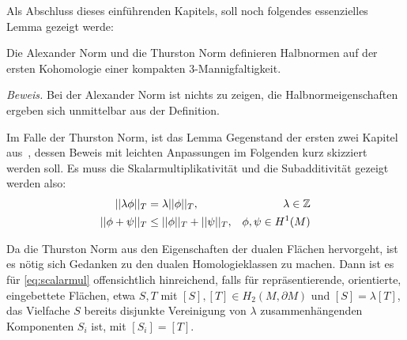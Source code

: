         Als Abschluss dieses einführenden Kapitels, soll noch folgendes essenzielles Lemma gezeigt werde:
        \begin{lem}
        \label{lem:norm}
        	Die Alexander Norm und die Thurston Norm definieren Halbnormen auf der ersten Kohomologie einer kompakten 3-Mannigfaltigkeit. 
        \end{lem}
          \noindent\textit{Beweis.}
            Bei der Alexander Norm ist nichts zu zeigen, die Halbnormeigenschaften ergeben sich unmittelbar aus der Definition.

            Im Falle der Thurston Norm, ist das Lemma Gegenstand der ersten zwei Kapitel aus~\cite{Thurston.1986}, dessen Beweis mit leichten Anpassungen im Folgenden kurz skizziert werden soll.
            Es muss die Skalarmultiplikativität und die Subadditivität gezeigt werden also:
            \begin{align}
                ||\lambda\phi||_T & = \lambda ||\phi||_T ,&\lambda \in\mathbb{Z} \label{eq:scalarmul} \\
                ||\phi + \psi||_T &\leq ||\phi||_T + ||\psi||_T ,& \phi,\psi \in H^1(M) \label{eq:subadd}
            \end{align} 


            Da die Thurston Norm aus den Eigenschaften der dualen Flächen hervorgeht, ist es nötig sich Gedanken zu den dualen Homologieklassen zu machen. Dann ist es für \eqref{eq:scalarmul} offensichtlich hinreichend, falls für repräsentierende, orientierte, eingebettete Flächen, etwa $S,T$ mit $[S],[T]\in H_2(M,\partial M)$ und $[S]=\lambda [T]$, das Vielfache $S$ bereits disjunkte Vereinigung von $\lambda$ zusammenhängenden Komponenten $S_i$ ist, mit $[S_i]=[T]$. 

